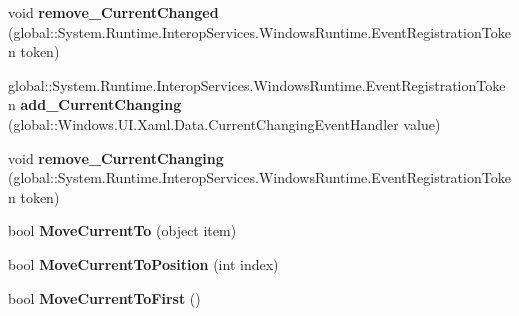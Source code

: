 \begin{DoxyCompactItemize}
\item 
\mbox{\label{interface_windows_1_1_u_i_1_1_xaml_1_1_data_1_1_i_collection_view_a44b0918807f968027d0578f623c02f67}} 
void {\bfseries remove\+\_\+\+Current\+Changed} (global\+::\+System.\+Runtime.\+Interop\+Services.\+Windows\+Runtime.\+Event\+Registration\+Token token)
\item 
\mbox{\label{interface_windows_1_1_u_i_1_1_xaml_1_1_data_1_1_i_collection_view_afb83479ac9e19cc076a82ee507d64a75}} 
global\+::\+System.\+Runtime.\+Interop\+Services.\+Windows\+Runtime.\+Event\+Registration\+Token {\bfseries add\+\_\+\+Current\+Changing} (global\+::\+Windows.\+U\+I.\+Xaml.\+Data.\+Current\+Changing\+Event\+Handler value)
\item 
\mbox{\label{interface_windows_1_1_u_i_1_1_xaml_1_1_data_1_1_i_collection_view_aaeb8082e843bdfe31cc2c2cde59291c9}} 
void {\bfseries remove\+\_\+\+Current\+Changing} (global\+::\+System.\+Runtime.\+Interop\+Services.\+Windows\+Runtime.\+Event\+Registration\+Token token)
\item 
\mbox{\label{interface_windows_1_1_u_i_1_1_xaml_1_1_data_1_1_i_collection_view_aa3e3071eca08209ea25a6a0bb1f3171c}} 
bool {\bfseries Move\+Current\+To} (object item)
\item 
\mbox{\label{interface_windows_1_1_u_i_1_1_xaml_1_1_data_1_1_i_collection_view_ae88f3d07181d3a6e208afb6bda974829}} 
bool {\bfseries Move\+Current\+To\+Position} (int index)
\item 
\mbox{\label{interface_windows_1_1_u_i_1_1_xaml_1_1_data_1_1_i_collection_view_ad33f946fe8c227113abf86382ef89863}} 
bool {\bfseries Move\+Current\+To\+First} ()
\item 
\mbox{\label{interface_windows_1_1_u_i_1_1_xaml_1_1_data_1_1_i_collection_view_ae65c293d74c8ea11c12e336ac356a09b}} 

\end{DoxyCompactItemize}
